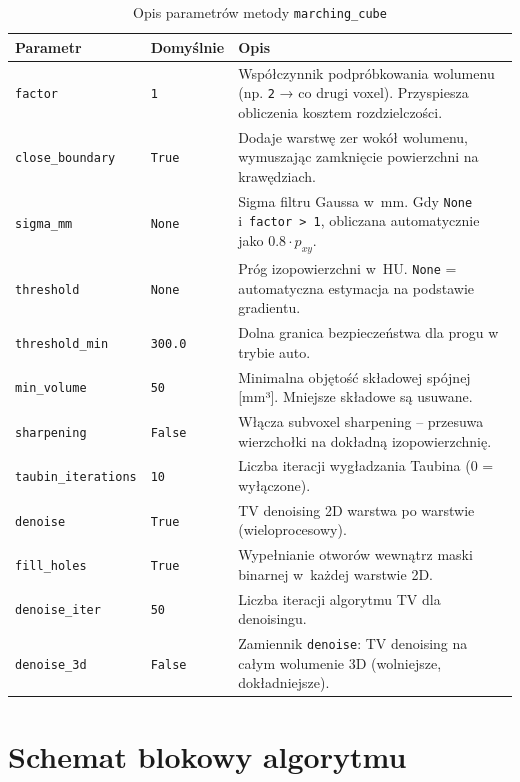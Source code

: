 \documentclass[12pt,a4paper]{article}
\begin{document}
\begin{table}[H]
\centering
\caption{Opis parametrów metody \texttt{marching\_cube}}
\begin{tabular}{@{}llp{8cm}@{}}
\toprule
\textbf{Parametr} & \textbf{Domyślnie} & \textbf{Opis} \\
\midrule
\texttt{factor}           & \texttt{1}     & Współczynnik podpróbkowania wolumenu (np. \texttt{2} → co drugi voxel). Przyspiesza obliczenia kosztem rozdzielczości. \\
\texttt{close\_boundary}  & \texttt{True}  & Dodaje warstwę zer wokół wolumenu, wymuszając zamknięcie powierzchni na krawędziach. \\
\texttt{sigma\_mm}        & \texttt{None}  & Sigma filtru Gaussa w~mm. Gdy \texttt{None} i~\texttt{factor > 1}, obliczana automatycznie jako $0.8 \cdot p_{xy}$. \\
\texttt{threshold}        & \texttt{None}  & Próg izopowierzchni w~HU. \texttt{None} = automatyczna estymacja na podstawie gradientu. \\
\texttt{threshold\_min}   & \texttt{300.0} & Dolna granica bezpieczeństwa dla progu w trybie auto. \\
\texttt{min\_volume}      & \texttt{50}    & Minimalna objętość składowej spójnej [mm³]. Mniejsze składowe są usuwane. \\
\texttt{sharpening}       & \texttt{False} & Włącza subvoxel sharpening -- przesuwa wierzchołki na dokładną izopowierzchnię. \\
\texttt{taubin\_iterations} & \texttt{10}  & Liczba iteracji wygładzania Taubina (0 = wyłączone). \\
\texttt{denoise}          & \texttt{True}  & TV denoising 2D warstwa po warstwie (wieloprocesowy). \\
\texttt{fill\_holes}      & \texttt{True}  & Wypełnianie otworów wewnątrz maski binarnej w~każdej warstwie 2D. \\
\texttt{denoise\_iter}    & \texttt{50}    & Liczba iteracji algorytmu TV dla denoisingu. \\
\texttt{denoise\_3d}      & \texttt{False} & Zamiennik \texttt{denoise}: TV denoising na całym wolumenie 3D (wolniejsze, dokładniejsze). \\
\bottomrule
\end{tabular}
\end{table}

\section{Schemat blokowy algorytmu}
\end{document}

